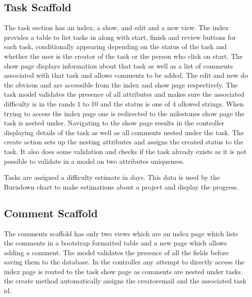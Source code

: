 \documentclass[a4wide, 11pt]{article}
\begin{document}
\subsection{Task Scaffold}
The task section has an index, a show, and edit and a new view. The index provides a table to list tasks in along with start, finish and review buttons for each task, conditionally appearing depending on the status of the task and whether the user is the creator of the task or the person who click on start. The show page displays information about that task as well as a list of comments associated with that task and allows comments to be added. The edit and new do the obvious and are accessible from the index and show page respectively. The task model validates the presence of all attributes and makes sure the associated difficulty is in the rands 1 to 10 and the status is one of 4 allowed strings. When trying to access the index page one is redirected to the milestones show page the task is nested under. Navigating to the show page results in the controller displaying details of the task as well as all comments nested under the task. The create action sets up the nesting attributes and assigns the created status to the task. It also does some validation and checks if the task already exists as it is not possible to validate in a model on two attributes uniqueness. 

Tasks are assigned a difficulty estimate in days. This data is used by the Burndown chart to make estimations about a project and display the progress.

\subsection{Comment Scaffold}
The comments scaffold has only two views which are an index page which lists the comments in a bootstrap formatted table and a new page which allows adding a comment. The model validates the presence of all the fields before saving them to the database. In the controller any attempt to directly access the index page is routed to the task show page as comments are nested under tasks. the create method automatically assigns the creatoremail and the associated task id.
\end{document}
